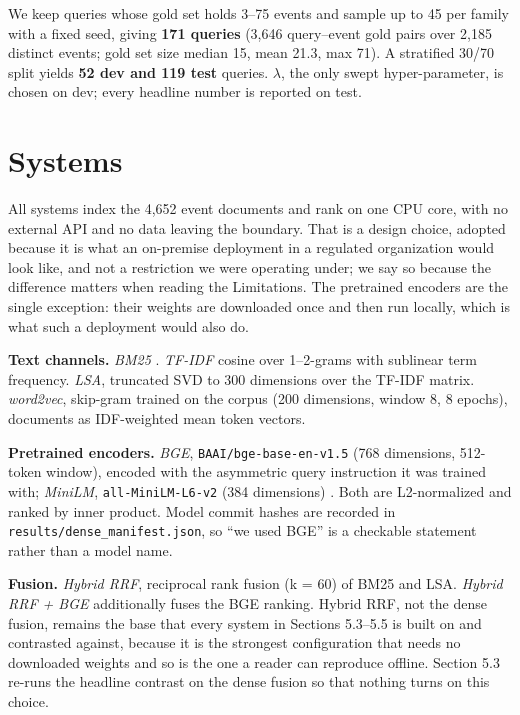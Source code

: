 \documentclass[acmsmall]{acmart}
\begin{document}
We keep queries whose gold set holds 3--75 events and sample up to 45 per family with a fixed seed, giving \textbf{171 queries} (3,646 query--event gold pairs over 2,185 distinct events; gold set size median 15, mean 21.3, max 71). A stratified 30/70 split yields \textbf{52 dev and 119 test} queries. $\lambda$, the only swept hyper-parameter, is chosen on dev; every headline number is reported on test.


\section{Systems}
All systems index the 4,652 event documents and rank on one CPU core, with no external API and no data leaving the boundary. That is a design choice, adopted because it is what an on-premise deployment in a regulated organization would look like, and not a restriction we were operating under; we say so because the difference matters when reading the Limitations. The pretrained encoders are the single exception: their weights are downloaded once and then run locally, which is what such a deployment would also do.

\textbf{Text channels.} \textit{BM25} \cite{robertson2009bm25}. \textit{TF-IDF} cosine over 1--2-grams with sublinear term frequency. \textit{LSA}, truncated SVD to 300 dimensions over the TF-IDF matrix. \textit{word2vec}, skip-gram trained on the corpus (200 dimensions, window 8, 8 epochs), documents as IDF-weighted mean token vectors.

\textbf{Pretrained encoders.} \textit{BGE}, \texttt{BAAI/bge-base-en-v1.5} (768 dimensions, 512-token window), encoded with the asymmetric query instruction it was trained with; \textit{MiniLM}, \texttt{all-MiniLM-L6-v2} (384 dimensions) \cite{reimers2019sbert}. Both are L2-normalized and ranked by inner product. Model commit hashes are recorded in \texttt{results/dense\_\allowbreak{}manifest.json}, so ``we used BGE'' is a checkable statement rather than a model name.

\textbf{Fusion.} \textit{Hybrid RRF}, reciprocal rank fusion (k = 60) of BM25 and LSA. \textit{Hybrid RRF + BGE} additionally fuses the BGE ranking. Hybrid RRF, not the dense fusion, remains the base that every system in Sections 5.3--5.5 is built on and contrasted against, because it is the strongest configuration that needs no downloaded weights and so is the one a reader can reproduce offline. Section 5.3 re-runs the headline contrast on the dense fusion so that nothing turns on this choice.
\end{document}
